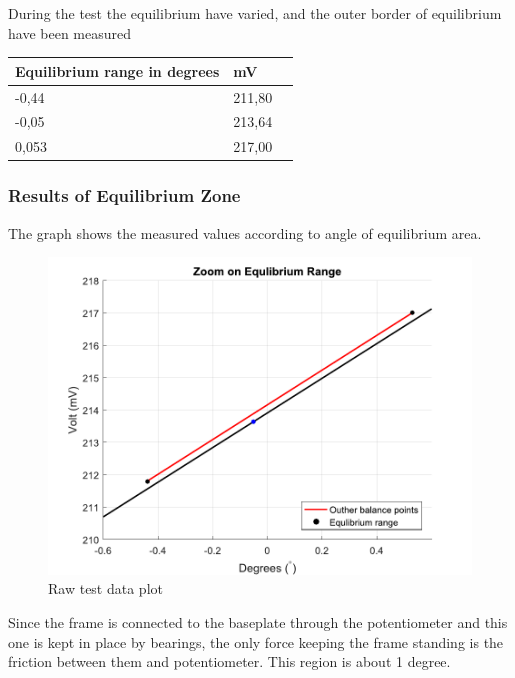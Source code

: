 During the test the equilibrium have varied, and the outer border of equilibrium have been measured 

\begin{table}[H]
	\begin{tabular}{|l|l|p{4.3cm}|}
		\hline%
		\textbf{Equilibrium range in degrees}       &  \textbf{mV}         \\
		\hline%
		-0,44                               			  & 211,80               \\
		\hline%
		-0,05                                          & 213,64               \\
		\hline%
		0,053 										  & 217,00              \\
		\hline%
	\end{tabular}
\end{table}

\subsubsection{Results of Equilibrium Zone}
The graph shows the measured values according to angle of equilibrium area.
\begin{figure}[H] 
	\centering 
	\includegraphics[scale=0.7]{figures/linearityOfPotmeterTest2-2}
	\caption{Raw test data plot}
	\label{linearityOfPotmeterTest2-2}
\end{figure}
Since the frame is connected to the baseplate through the potentiometer and this one is kept in place by bearings, the only force keeping the frame standing is the friction between them and potentiometer. This region is about 1 degree.


